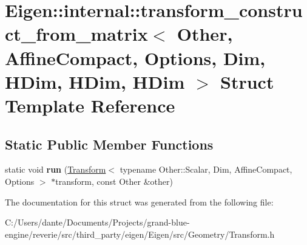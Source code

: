 \hypertarget{struct_eigen_1_1internal_1_1transform__construct__from__matrix_3_01_other_00_01_affine_compact_0db5fc8047dca3fa661370cba4245d7ad}{}\section{Eigen\+::internal\+::transform\+\_\+construct\+\_\+from\+\_\+matrix$<$ Other, Affine\+Compact, Options, Dim, H\+Dim, H\+Dim, H\+Dim $>$ Struct Template Reference}
\label{struct_eigen_1_1internal_1_1transform__construct__from__matrix_3_01_other_00_01_affine_compact_0db5fc8047dca3fa661370cba4245d7ad}
\subsection*{Static Public Member Functions}
\begin{DoxyCompactItemize}
\item 
\mbox{\label{struct_eigen_1_1internal_1_1transform__construct__from__matrix_3_01_other_00_01_affine_compact_0db5fc8047dca3fa661370cba4245d7ad_a804f671b45dd7794fa2c33b5f0e25040}} 
static void {\bfseries run} (\mbox{\hyperlink{class_eigen_1_1_transform}{Transform}}$<$ typename Other\+::\+Scalar, Dim, Affine\+Compact, Options $>$ $\ast$transform, const Other \&other)
\end{DoxyCompactItemize}


The documentation for this struct was generated from the following file\+:\begin{DoxyCompactItemize}
\item 
C\+:/\+Users/dante/\+Documents/\+Projects/grand-\/blue-\/engine/reverie/src/third\+\_\+party/eigen/\+Eigen/src/\+Geometry/Transform.\+h\end{DoxyCompactItemize}
